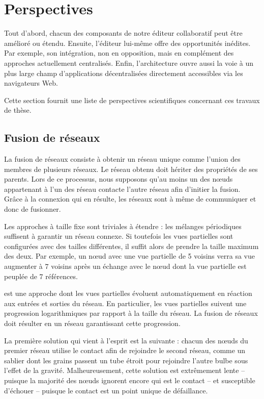 
\section{Perspectives}
\label{conclu:sec:perspectives}

Tout d'abord, chacun des composants de notre éditeur collaboratif peut être
amélioré ou étendu. Ensuite, l'éditeur lui-même offre des opportunités
inédites. Par exemple, son intégration, non en opposition, mais en complément
des approches actuellement centralisés. Enfin, l'architecture ouvre aussi la
voie à un plus large champ d'applications décentralisées directement
accessibles via les navigateurs Web.

\noindent  Cette section fournit une liste de
perspectives scientifiques concernant ces travaux de thèse.

\subsection{Fusion de réseaux}

\label{conclu:subsec:merging}

La fusion de réseaux consiste à obtenir un réseau unique comme l'union des
membres de plusieurs réseaux. Le réseau obtenu doit hériter des propriétés de
ses parents.  Lors de ce processus, nous supposons qu'au moins un des nœuds
appartenant à l'un des réseau contacte l'autre réseau afin d'initier la
fusion. Grâce à la connexion qui en résulte, les réseaux sont à même de
communiquer et donc de fusionner.

Les approches à taille fixe sont triviales à étendre : les mélanges périodiques
suffisent à garantir un réseau connexe. Si toutefois les vues partielles sont
configurées avec des tailles différentes, il suffit alors de prendre la taille
maximum des deux. Par exemple, un nœud avec une vue partielle de 5 voisins verra
sa vue augmenter à $7$ voisins après un échange avec le nœud dont la vue
partielle est peuplée de $7$ références.

\SPRAY est une approche dont les vues partielles évoluent automatiquement en
réaction aux entrées et sorties du réseau. En particulier, les vues partielles
suivent une progression logarithmiques par rapport à la taille du réseau. La
fusion de réseaux \SPRAY doit résulter en un réseau \SPRAY garantissant cette
progression.

La première solution qui vient à l'esprit est la suivante : chacun des nœuds du
premier réseau utilise le contact afin de rejoindre le second réseau, comme un
sablier dont les grains passent un tube étroit pour rejoindre l'autre bulbe sous
l'effet de la gravité. Malheureusement, cette solution est extrêmement lente --
puisque la majorité des nœuds ignorent encore qui est le contact -- et
susceptible d'échouer -- puisque le contact est un point unique de défaillance.

